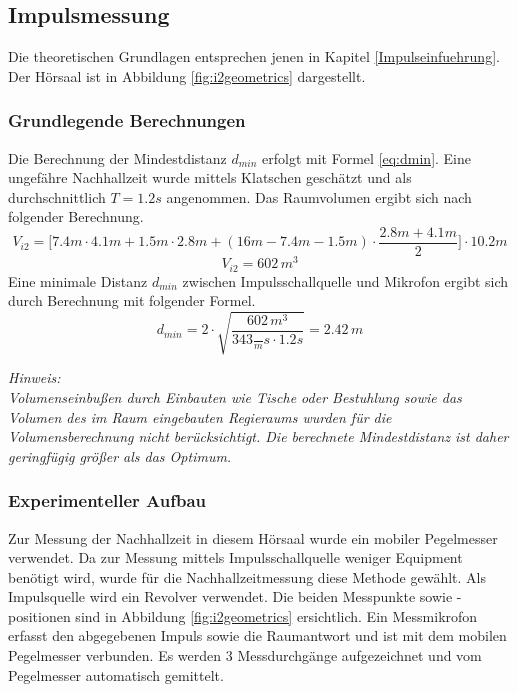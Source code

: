 \documentclass[11pt]{report}
\begin{document}
\subsection{Impulsmessung}
Die theoretischen Grundlagen entsprechen jenen in Kapitel \ref{Impulseinfuehrung}. Der H\"orsaal ist in Abbildung \ref{fig:i2geometrics} dargestellt.
\subsubsection{Grundlegende Berechnungen}
Die Berechnung der Mindestdistanz $d_{min}$ erfolgt mit Formel \ref{eq:dmin}. Eine ungef\"ahre Nachhallzeit wurde mittels Klatschen gesch\"atzt und als durchschnittlich $T=1.2s$ angenommen. Das Raumvolumen ergibt sich nach folgender Berechnung.
\begin{equation}
V_{i2}=\Big[7.4m\cdot4.1m+1.5m\cdot2.8m+(16m-7.4m-1.5m)\cdot\frac{2.8m+4.1m}{2}\Big]\cdot10.2m
\end{equation}
\begin{equation}
V_{i2}= 602\,m^{3}
\end{equation}
Eine minimale Distanz $d_{min}$ zwischen Impulsschallquelle und Mikrofon ergibt sich durch Berechnung mit folgender Formel.
\begin{equation}
d_{min}=2\cdot\sqrt{\frac{602\,m^{3}}{343\frac\,{m}{s}\cdot 1.2s}}=2.42\,m
\end{equation}
\begin{leftbar}
\textit{ Hinweis:\\
Volumenseinbu\ss en durch Einbauten wie Tische oder Bestuhlung sowie das Volumen des im Raum eingebauten Regieraums wurden f\"ur die Volumensberechnung nicht ber\"ucksichtigt. Die berechnete Mindestdistanz ist daher geringf\"ugig gr\"o\ss er als das Optimum.}
\end{leftbar}
\subsubsection{Experimenteller Aufbau}
Zur Messung der Nachhallzeit in diesem H\"orsaal wurde ein mobiler Pegelmesser verwendet. Da zur Messung mittels Impulsschallquelle weniger Equipment ben\"otigt wird, wurde f\"ur die Nachhallzeitmessung diese Methode gew\"ahlt. Als Impulsquelle wird ein Revolver verwendet. Die beiden Messpunkte sowie -positionen sind in Abbildung \ref{fig:i2geometrics} ersichtlich. Ein Messmikrofon erfasst den abgegebenen Impuls sowie die Raumantwort und ist mit dem mobilen Pegelmesser verbunden. Es werden 3 Messdurchg\"ange aufgezeichnet und vom Pegelmesser automatisch gemittelt.
\end{document}
